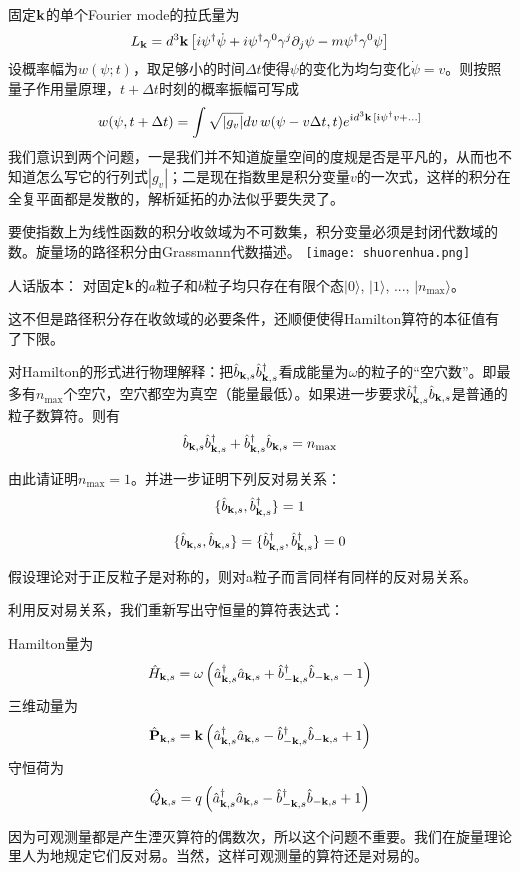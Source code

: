 \documentclass[CJK]{beamer}
\begin{document}
\begin{frame}
\bch
固定${\mathbf{k}}$的单个Fourier mode的拉氏量为
$$L_{\mathbf{k}} = d^3{\mathbf{k}} \left[ i\psi^\dagger\dot\psi + i\psi^\dagger\gamma^0\gamma^j\partial_j\psi - m \psi^\dagger\gamma^0 \psi \right]$$
设概率幅为$w(\psi;t)$，取足够小的时间$\Delta t$使得$\psi$的变化为均匀变化$\dot\psi = v$。则按照量子作用量原理，$t+\Delta t$时刻的概率振幅可写成
$$w(\psi, t+\Delta t) = \int \sqrt{|g_v|}dv\, w(\psi - v \Delta t, t) e^{{\dot{\imath}} d^3{\mathbf{k}}\,[{\dot{\imath}}\psi^\dagger v + \ldots]}$$
我们意识到两个问题，一是我们并不知道旋量空间的度规是否是平凡的，从而也不知道怎么写它的行列式$|g_v|$；二是现在指数里是积分变量$v$的一次式，这样的积分在全复平面都是发散的，解析延拓的办法似乎要失灵了。
\ech
\end{frame}


\begin{frame}
\bch
要使指数上为线性函数的积分收敛域为不可数集，积分变量必须是封闭代数域的数。旋量场的路径积分由Grassmann代数描述。
\texttt{[image: shuorenhua.png]}

\ech
\end{frame}



\begin{frame}
\bch
人话版本： 对固定${\mathbf{k}}$的$a$粒子和$b$粒子均只存在有限个态$|0\rangle$, $|1\rangle$, ..., $|n_{\max}\rangle$。

\skipline
\skipline
\skipline
这不但是路径积分存在收敛域的必要条件，还顺便使得Hamilton算符的本征值有了下限。
\ech
\end{frame}


\begin{frame}
\bch
对Hamilton的形式进行物理解释：把${\hat{b}}_{{\mathbf{k}},s}{\hat{b}^\dagger}_{{\mathbf{k}},s}$看成能量为$\omega$的粒子的“空穴数”。即最多有$n_{\max}$个空穴，空穴都空为真空（能量最低）。如果进一步要求${\hat{b}^\dagger}_{{\mathbf{k}},s}{\hat{b}}_{{\mathbf{k}},s}$是普通的粒子数算符。则有
$${\hat{b}}_{{\mathbf{k}},s}{\hat{b}^\dagger}_{{\mathbf{k}},s} + {\hat{b}^\dagger}_{{\mathbf{k}},s}{\hat{b}}_{{\mathbf{k}},s} = n_{\max}$$ 

由此请证明$n_{\max} = 1$。并进一步证明下列反对易关系：
$$\{{\hat{b}}_{{\mathbf{k}},s},{\hat{b}^\dagger}_{{\mathbf{k}},s}\} = 1$$

$$\{{\hat{b}}_{{\mathbf{k}},s}, {\hat{b}}_{{\mathbf{k}},s} \} = \{ {\hat{b}^\dagger}_{{\mathbf{k}},s}, {\hat{b}^\dagger}_{{\mathbf{k}},s}\} = 0$$

假设理论对于正反粒子是对称的，则对a粒子而言同样有同样的反对易关系。
\ech
\end{frame}


\begin{frame}
\bch
利用反对易关系，我们重新写出守恒量的算符表达式：

Hamilton量为
$$\hat{H}_{{\mathbf{k}},s} =  \omega\left({\hat{a}^\dagger}_{{\mathbf{k}},s}{\hat{a}}_{{\mathbf{k}},s} + {\hat{b}^\dagger}_{-{\mathbf{k}},s}{\hat{b}}_{-{\mathbf{k}},s} -1\right)$$
三维动量为
$$\hat{\mathbf{P}}_{{\mathbf{k}},s} =  {\mathbf{k}}\left({\hat{a}^\dagger}_{{\mathbf{k}},s}{\hat{a}}_{{\mathbf{k}},s} - {\hat{b}^\dagger}_{-{\mathbf{k}},s}{\hat{b}}_{-{\mathbf{k}},s} + 1 \right)$$
守恒荷为
$$\hat{Q}_{{\mathbf{k}},s} =  q\left({\hat{a}^\dagger}_{{\mathbf{k}},s}{\hat{a}}_{{\mathbf{k}},s} - {\hat{b}^\dagger}_{-{\mathbf{k}},s}{\hat{b}}_{-{\mathbf{k}},s} + 1 \right)$$

\ech
\end{frame}

\begin{frame}
\bch

因为可观测量都是产生湮灭算符的偶数次，所以这个问题不重要。我们在旋量理论里人为地规定它们反对易。当然，这样可观测量的算符还是对易的。
\ech
\end{frame}
\end{document}
